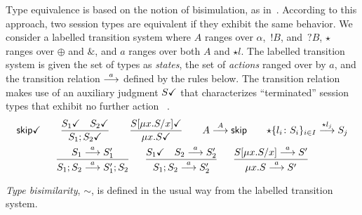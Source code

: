Type equivalence is based on the notion of bisimulation, as
in~\cite{thiemann2016context}. According to this approach, two session
types are equivalent if they exhibit the same behavior. We consider a
labelled transition system where $A$ ranges over $\alpha$, $\,!B$, and
$\,?B$, $\star$ ranges over $\oplus$ and $\&$, and $a$ ranges over
both $A$ and $\star l$.
%
The labelled transition system is given the set of types as
\emph{states}, the set of \emph{actions} ranged over by $a$, and the
transition relation $\LTSderives$ defined by the rules below. The
transition relation makes use of an auxiliary judgment $\DONE{S}$ that
characterizes ``terminated'' session types that exhibit no further
action~\cite{DBLP:journals/jacm/AcetoH92} .
%
  \begin{gather*}
    \DONE{\skipk}
    \qquad
    \frac{\DONE{S_1} \quad \DONE{S_2}}{\DONE{S_1; S_2}}
    \qquad
    \frac{\DONE{S[\mu x.S/x]}}{\DONE{\mu x.S}}
    \qquad
    {A \LTSderives[A] \skipk }
    \qquad
    {\star\{l_i\colon S_i\}_{i\in I} \LTSderives[\star l_j] S_j}
    \\
    \frac{S_1 \LTSderives S_1'}{S_1; S_2 \LTSderives S_1';S_2}
    \quad\;\;
    \frac{\DONE{S_1} \quad S_2 \LTSderives S_2'}{S_1; S_2 \LTSderives S_2'}
    \quad\;\;
    \frac{S[\mu x.S/x] \LTSderives S'}{\mu x.S \LTSderives S'}
  \end{gather*}

\emph{Type bisimilarity}, $\sim$, is defined in the usual way from the
labelled transition system.

